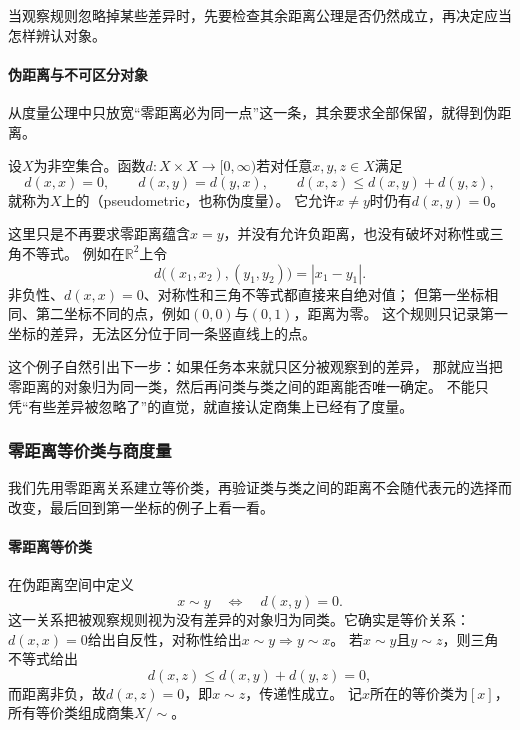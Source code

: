 当观察规则忽略掉某些差异时，先要检查其余距离公理是否仍然成立，再决定应当怎样辨认对象。

\paragraph{伪距离与不可区分对象}

从度量公理中只放宽“零距离必为同一点”这一条，其余要求全部保留，就得到伪距离。

\begin{definition}[伪距离]
\label{def:analysis-pseudometric}
设$X$为非空集合。函数$d:X\times X\to[0,\infty)$若对任意$x,y,z\in X$满足
\[
  d(x,x)=0,\qquad d(x,y)=d(y,x),\qquad d(x,z)\leq d(x,y)+d(y,z),
\]
就称为$X$上的（pseudometric，也称伪度量）。
它允许$x\neq y$时仍有$d(x,y)=0$。
\end{definition}

这里只是不再要求零距离蕴含$x=y$，并没有允许负距离，也没有破坏对称性或三角不等式。
例如在$\mathbb R^2$上令
\[
  d\bigl((x_1,x_2),(y_1,y_2)\bigr)=|x_1-y_1|.
\]
非负性、$d(x,x)=0$、对称性和三角不等式都直接来自绝对值；
但第一坐标相同、第二坐标不同的点，例如$(0,0)$与$(0,1)$，距离为零。
这个规则只记录第一坐标的差异，无法区分位于同一条竖直线上的点。

这个例子自然引出下一步：如果任务本来就只区分被观察到的差异，
那就应当把零距离的对象归为同一类，然后再问类与类之间的距离能否唯一确定。
不能只凭“有些差异被忽略了”的直觉，就直接认定商集上已经有了度量。

\subsubsection{零距离等价类与商度量}
\label{sec:metric-quotient-metric}

我们先用零距离关系建立等价类，再验证类与类之间的距离不会随代表元的选择而改变，最后回到第一坐标的例子上看一看。

\paragraph{零距离等价类}

在伪距离空间中定义
\[
  x\sim y\quad\Longleftrightarrow\quad d(x,y)=0.
\]
这一关系把被观察规则视为没有差异的对象归为同类。它确实是等价关系：
$d(x,x)=0$给出自反性，对称性给出$x\sim y\Rightarrow y\sim x$。
若$x\sim y$且$y\sim z$，则三角不等式给出
\[
  d(x,z)\leq d(x,y)+d(y,z)=0,
\]
而距离非负，故$d(x,z)=0$，即$x\sim z$，传递性成立。
记$x$所在的等价类为$[x]$，所有等价类组成商集$X/{\sim}$。

